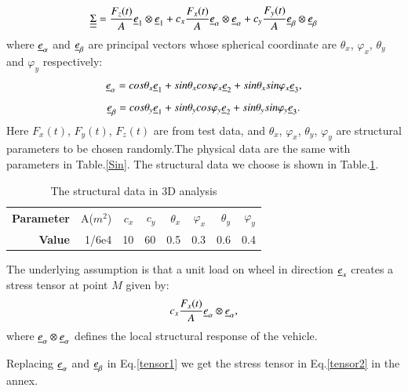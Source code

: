 \documentclass[3p,times,number,review]{elsarticle}
\begin{document}
 \begin{equation}
 \uline{\uline{\Sigma}}=\dfrac{F_z(t)}{A}\uline{e}_1\otimes \uline{e}_1+c_x\dfrac{F_x(t)}{A}\uline{e}_{\alpha}\otimes \uline{e}_{\alpha}+c_y\dfrac{F_y(t)}{A}\uline{e}_{\beta}\otimes \uline{e}_{\beta}
 \label{tensor1}
 \end{equation}
 where $\uline{e}_{\alpha}$  and $\uline{e}_{\beta}$ are principal vectors whose spherical coordinate are $\theta_x$, $\varphi_x$,  $\theta_y$ and $\varphi_y$ respectively:
  $$\uline{e}_{\alpha}=cos\theta_x\uline{e}_1+sin\theta_xcos\varphi_x\uline{e}_2+sin\theta_xsin\varphi_x\uline{e}_3,$$
 $$\uline{e}_{\beta}=cos\theta_y\uline{e}_1+sin\theta_ycos\varphi_y\uline{e}_2+sin\theta_ysin\varphi_y\uline{e}_3.$$
 Here $F_x(t)$, $F_y(t)$, $F_z(t)$ are from test data, and $\theta_x$, $\varphi_x$, $\theta_y$, $\varphi_y$ are structural parameters to be chosen randomly.The physical data are the same with parameters in Table.\ref{Sin}. The structural data we choose is shown in Table.\ref{structural}.
 
  \begin{table}[!h]
  	\centering
    \begin{tabular}{rrrrrrrr}
  		\hline
  		\textbf{Parameter} & A($m^2$) & $c_x$ & $c_y$ & $\theta_x$ & $\varphi_x$ & $\theta_y$ & $\varphi_y$ \\
  		\textbf{Value}      & 1/6e4                  & 10    & 60    & 0.5        & 0.3         & 0.6        & 0.4         \\ \hline
  	\end{tabular}
  	\caption{The structural data in 3D analysis}
  	\label{structural}
  \end{table}
 
 The underlying assumption is that a unit load on wheel in direction $\uline{e}_x$ creates a stress tensor at point $M$ given by:
 $$c_x\dfrac{F_x(t)}{A}\uline{e}_{\alpha}\otimes \uline{e}_{\alpha},$$
 where $\uline{e}_{\alpha}\otimes \uline{e}_{\alpha}$ defines the local structural response of the vehicle.
 
 Replacing $\uline{e}_{\alpha}$ and $\uline{e}_{\beta}$ in Eq.\eqref{tensor1} we get the stress tensor in Eq.\eqref{tensor2} in the annex. 
 


 
 
\end{document}
